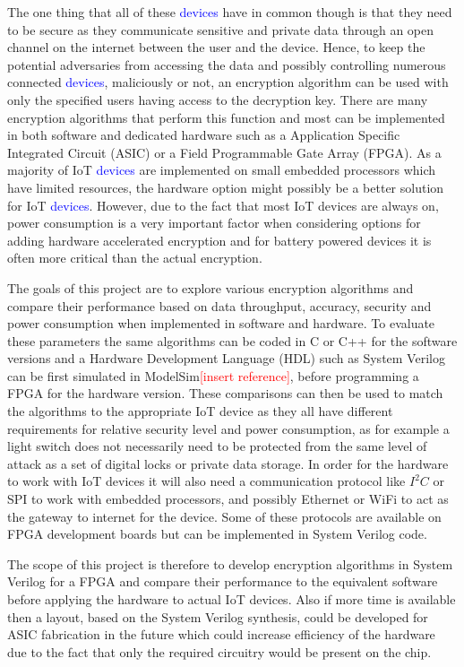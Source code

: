 \documentclass[12pt,twoside,a4paper]{report}
\begin{document}
    The one thing that all of these \textcolor{blue}{devices} have in common though is that they need to be secure as they communicate sensitive and private data through an open channel on the internet between the user and the device. Hence, to keep the potential adversaries from accessing the data and possibly controlling numerous connected \textcolor{blue}{devices}, maliciously or not, an encryption algorithm can be used with only the specified users having access to the decryption key. There are many encryption algorithms that perform this function and most can be implemented in both software and dedicated hardware such as a Application Specific Integrated Circuit (ASIC) or a Field Programmable Gate Array (FPGA). As a majority of IoT \textcolor{blue}{devices} are implemented on small embedded processors which have limited resources, the hardware option might possibly be a better solution for IoT \textcolor{blue}{devices}. 
    However, due to the fact that most IoT devices are always on, power consumption is a very important factor when considering options for adding hardware accelerated encryption and for battery powered devices it is often more critical than the actual encryption.
    
    The goals of this project are to explore various encryption algorithms and compare their performance based on data throughput, accuracy, security and power consumption when implemented in software and hardware. To evaluate these parameters the same algorithms can be coded in C or C++ for the software versions and a Hardware Development Language (HDL) such as System Verilog can be first simulated in ModelSim\textcolor{red}{[insert reference]}, before programming a FPGA for the hardware version. These comparisons can then be used to match the algorithms to the appropriate IoT device as they all have different requirements for relative security level and power consumption, as for example a light switch does not necessarily need to be protected from the same level of attack as a set of digital locks or private data storage. In order for the hardware to work with IoT devices it will also need a communication protocol like $I^2 C$ or SPI to work with embedded processors, and possibly Ethernet or WiFi to act as the gateway to internet for the device. Some of these protocols are available on FPGA development boards but can be implemented in System Verilog code.
    
    The scope of this project is therefore to develop encryption algorithms in System Verilog for a FPGA and compare their performance to the equivalent software before applying the hardware to actual IoT devices. Also if more time is available then a layout, based on the System Verilog synthesis, could be developed for ASIC fabrication in the future which could increase efficiency of the hardware due to the fact that only the required circuitry would be present on the chip.
    
\end{document}
